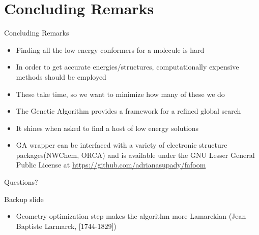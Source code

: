 \documentclass[10pt]{beamer}
\begin{document}
\section{Concluding Remarks}

{%
\begin{frame}{Concluding Remarks}
	\begin{itemize}[<+->]
		\item {Finding all the low energy conformers for a molecule is hard}
		\item {In order to get accurate energies/structures, computationally expensive methods should be employed}
		\item {These take time, so we want to minimize how many of these we do}
		\item {The Genetic Algorithm provides a framework for a refined global search}
		\item {It shines when asked to find a host of low energy solutions}
		\item {GA wrapper can be interfaced with a variety of electronic structure packages(NWChem, ORCA) and is available under the GNU Lesser General Public License at \url{https://github.com/adrianasupady/fafoom}}
		
	\end{itemize}
\end{frame}
}


\begin{frame}[standout]
  Questions?
\end{frame}

\appendix

\begin{frame}[fragile]{Backup slide}
	\begin{itemize}
		\item Geometry optimization step makes the algorithm more Lamarckian (Jean Baptiste Larmarck, [1744-1829])
	\end{itemize}
\end{frame}
\end{document}
